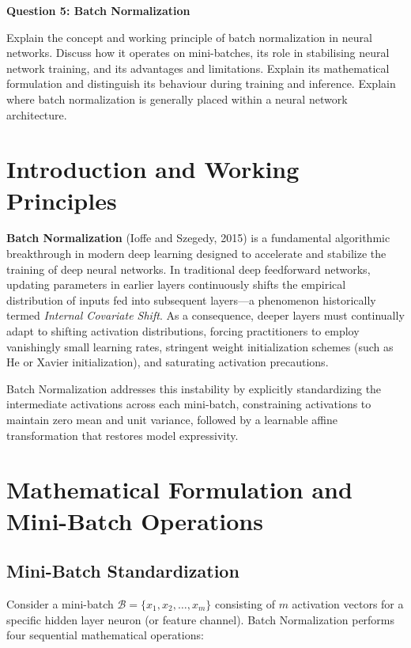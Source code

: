 \documentclass[12pt,a4paper]{article}
\begin{document}
{\noindent\LARGE\textbf{Question 5: Batch Normalization}}\par
\vspace{0.8em}
\noindent Explain the concept and working principle of batch normalization in neural networks. Discuss how it operates on mini-batches, its role in stabilising neural network training, and its advantages and limitations. Explain its mathematical formulation and distinguish its behaviour during training and inference. Explain where batch normalization is generally placed within a neural network architecture.
\par\vspace{1.2em}

\section{Introduction and Working Principles}
\textbf{Batch Normalization} (Ioffe and Szegedy, 2015) is a fundamental algorithmic breakthrough in modern deep learning designed to accelerate and stabilize the training of deep neural networks. In traditional deep feedforward networks, updating parameters in earlier layers continuously shifts the empirical distribution of inputs fed into subsequent layers—a phenomenon historically termed \textit{Internal Covariate Shift}. As a consequence, deeper layers must continually adapt to shifting activation distributions, forcing practitioners to employ vanishingly small learning rates, stringent weight initialization schemes (such as He or Xavier initialization), and saturating activation precautions.

Batch Normalization addresses this instability by explicitly standardizing the intermediate activations across each mini-batch, constraining activations to maintain zero mean and unit variance, followed by a learnable affine transformation that restores model expressivity.

\section{Mathematical Formulation and Mini-Batch Operations}

\subsection{Mini-Batch Standardization}
Consider a mini-batch $\mathcal{B} = \{x_1, x_2, \dots, x_m\}$ consisting of $m$ activation vectors for a specific hidden layer neuron (or feature channel). Batch Normalization performs four sequential mathematical operations:
\end{document}
